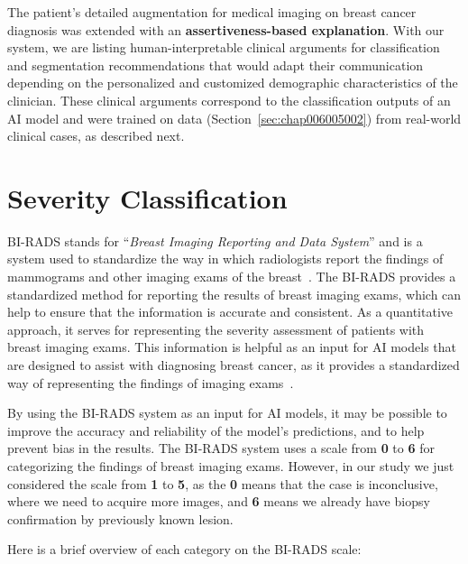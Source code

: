 The patient's detailed augmentation for medical imaging on breast cancer diagnosis was extended with an {\bf assertiveness-based explanation}.
With our system, we are listing human-interpretable clinical arguments for classification and segmentation recommendations that would adapt their communication depending on the personalized and customized demographic characteristics of the clinician.
These clinical arguments correspond to the classification outputs of an AI model and were trained on data (Section~\ref{sec:chap006005002}) from real-world clinical cases, as described next.










\section{Severity Classification}
\label{sec:app00100X}

\ac{BI-RADS} stands for ``{\it Breast Imaging Reporting and Data System}'' and is a system used to standardize the way in which radiologists report the findings of mammograms and other imaging exams of the breast~\cite{SPAK2017179, mckinney2020international}.
The \ac{BI-RADS} provides a standardized method for reporting the results of breast imaging exams, which can help to ensure that the information is accurate and consistent.
As a quantitative approach, it serves for representing the severity assessment of patients with breast imaging exams.
This information is helpful as an input for \ac{AI} models that are designed to assist with diagnosing breast cancer, as it provides a standardized way of representing the findings of imaging exams~\cite{MAICAS2019101562}.

By using the \ac{BI-RADS} system as an input for \ac{AI} models, it may be possible to improve the accuracy and reliability of the model's predictions, and to help prevent bias in the results.
The \ac{BI-RADS} system uses a scale from {\bf 0} to {\bf 6} for categorizing the findings of breast imaging exams.
However, in our study we just considered the scale from {\bf 1} to {\bf 5}, as the {\bf 0} means that the case is inconclusive, where we need to acquire more images, and {\bf 6} means we already have biopsy confirmation by previously known lesion.

\vspace{1.5mm}

\noindent
Here is a brief overview of each category on the \ac{BI-RADS} scale:

